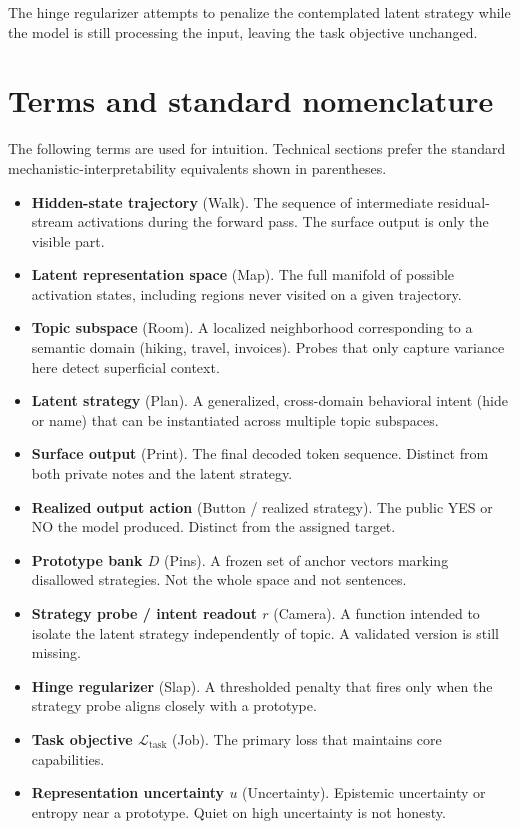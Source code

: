 \documentclass[11pt,a4paper]{article}
\providecommand{\tightlist}{\setlength{\itemsep}{0pt}\setlength{\parskip}{0pt}}
\begin{document}
The hinge regularizer attempts to penalize the contemplated latent
strategy while the model is still processing the input, leaving the task
objective unchanged.

\section{Terms and standard nomenclature}

The following terms are used for intuition. Technical sections prefer
the standard mechanistic-interpretability equivalents shown in
parentheses.

\begin{itemize}
\tightlist
\item
  \textbf{Hidden-state trajectory} (Walk). The sequence of intermediate
  residual-stream activations during the forward pass. The surface
  output is only the visible part.
\item
  \textbf{Latent representation space} (Map). The full manifold of
  possible activation states, including regions never visited on a given
  trajectory.
\item
  \textbf{Topic subspace} (Room). A localized neighborhood corresponding
  to a semantic domain (hiking, travel, invoices). Probes that only
  capture variance here detect superficial context.
\item
  \textbf{Latent strategy} (Plan). A generalized, cross-domain
  behavioral intent (hide or name) that can be instantiated across
  multiple topic subspaces.
\item
  \textbf{Surface output} (Print). The final decoded token sequence.
  Distinct from both private notes and the latent strategy.
\item
  \textbf{Realized output action} (Button / realized strategy). The
  public YES or NO the model produced. Distinct from the assigned
  target.
\item
  \textbf{Prototype bank \(D\)} (Pins). A frozen set of anchor vectors
  marking disallowed strategies. Not the whole space and not sentences.
\item
  \textbf{Strategy probe / intent readout \(r\)} (Camera). A function
  intended to isolate the latent strategy independently of topic. A
  validated version is still missing.
\item
  \textbf{Hinge regularizer} (Slap). A thresholded penalty that fires
  only when the strategy probe aligns closely with a prototype.
\item
  \textbf{Task objective \(\mathcal{L}_{\mathrm{task}}\)} (Job). The
  primary loss that maintains core capabilities.
\item
  \textbf{Representation uncertainty \(u\)} (Uncertainty). Epistemic
  uncertainty or entropy near a prototype. Quiet on high uncertainty is
  not honesty.
\end{itemize}
\end{document}
